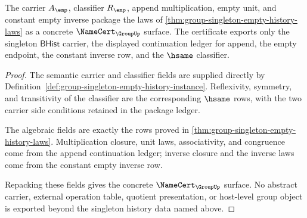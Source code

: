 \begin{theorem}
\label{thm:group-singleton-empty-history-namecert}
The carrier $A_{\emp}$, classifier $R_{\emp}$, append multiplication, empty
unit, and constant empty inverse package the laws of
\autoref{thm:group-singleton-empty-history-laws} as a concrete
$\NameCert_{\GroupUp}$ surface. The certificate exports only the singleton
$\mathsf{BHist}$ carrier, the displayed continuation ledger for append, the
empty endpoint, the constant inverse row, and the $\hsame$ classifier.
\end{theorem}
\begin{proof}
The semantic carrier and classifier fields are supplied directly by
Definition~\ref{def:group-singleton-empty-history-instance}. Reflexivity,
symmetry, and transitivity of the classifier are the corresponding $\hsame$
rows, with the two carrier side conditions retained in the package ledger.

The algebraic fields are exactly the rows proved in
\autoref{thm:group-singleton-empty-history-laws}. Multiplication closure, unit
laws, associativity, and congruence come from the append continuation ledger;
inverse closure and the inverse laws come from the constant empty inverse row.

Repacking these fields gives the concrete $\NameCert_{\GroupUp}$ surface. No
abstract carrier, external operation table, quotient presentation, or
host-level group object is exported beyond the singleton history data named
above.
\end{proof}
